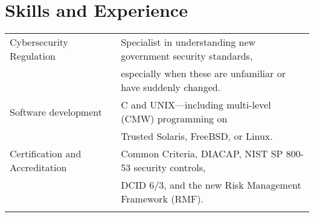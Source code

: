 \section*{Skills and Experience}\vspace{-3mm}

\begin{tabular}{ll}
    \hline
    Cybersecurity Regulation & Specialist in understanding new government
        security standards, \\
        & especially when these are unfamiliar or have suddenly changed.
            \vspace{1.5mm} \\

    Software development & C and UNIX---including multi-level (CMW) programming on \\
        & Trusted Solaris, FreeBSD, or Linux. \vspace{1.5mm} \\

    Certification and Accreditation & Common Criteria, DIACAP, NIST SP 800-53 security controls, \\
         & DCID 6/3, and the new Risk Management Framework (RMF). \\

    \hline\vspace{-4mm}
\end{tabular}

